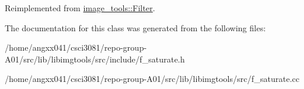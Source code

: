 Reimplemented from \hyperlink{classimage__tools_1_1Filter_afd5d1be5736e343077d331896d4130d9}{image\+\_\+tools\+::\+Filter}.



The documentation for this class was generated from the following files\+:\begin{DoxyCompactItemize}
\item 
/home/angxx041/csci3081/repo-\/group-\/\+A01/src/lib/libimgtools/src/include/f\+\_\+saturate.\+h\item 
/home/angxx041/csci3081/repo-\/group-\/\+A01/src/lib/libimgtools/src/f\+\_\+saturate.\+cc\end{DoxyCompactItemize}
